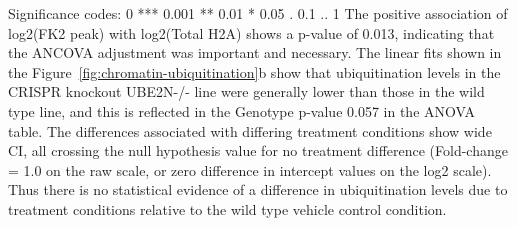 Significance codes:  0 *** 0.001 ** 0.01 * 0.05 . 0.1 .. 1
\newline
The positive association of log2(FK2 peak) with log2(Total H2A) shows a p-value of 0.013, indicating that the ANCOVA adjustment was important and necessary. The linear fits shown in the Figure~\ref{fig:chromatin-ubiquitination}b show that ubiquitination levels in the CRISPR knockout UBE2N-/- line were generally lower than those in the wild type line, and this is reflected in the Genotype p-value 0.057 in the ANOVA table. The differences associated with differing treatment conditions show wide CI, all crossing the null hypothesis value for no treatment difference (Fold-change = 1.0 on the raw scale, or zero difference in intercept values on the log2 scale).  Thus there is no statistical evidence of a difference in ubiquitination levels due to treatment conditions relative to the wild type vehicle control condition.  

